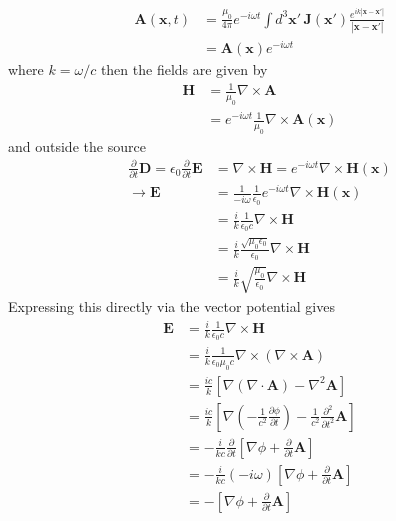 \documentclass[../main.tex]{subfiles}
\begin{document}
\begin{align}
\mathbf{A}(\mathbf{x},t)&=\frac{\mu_0}{4\pi}e^{-i\omega t}\int d^3\mathbf{x}'\,\mathbf{J}(\mathbf{x}')\frac{e^{ik|\mathbf{x}-\mathbf{x}'|}}{|\mathbf{x}-\mathbf{x}'|}\\
&=\mathbf{A}(\mathbf{x})e^{-i\omega t}
\end{align}
where $k=\omega/c$ then the fields are given by
\begin{align}
\mathbf{H}
&=\frac{1}{\mu_0}\nabla\times\mathbf{A}\\
&=e^{-i\omega t}\frac{1}{\mu_0}\nabla\times\mathbf{A}(\mathbf{x})
\end{align}
and outside the source
\begin{align}
\frac{\partial}{\partial t}\mathbf{D}
=\epsilon_0\frac{\partial}{\partial t}\mathbf{E}
&=\nabla\times\mathbf{H}=e^{-i\omega t}\nabla\times\mathbf{H}(\mathbf{x})\\
\rightarrow\mathbf{E}
&=\frac{1}{-i\omega}\frac{1}{\epsilon_0}e^{-i\omega t}\nabla\times\mathbf{H}(\mathbf{x})\\
&=\frac{i}{k}\frac{1}{\epsilon_0c}\nabla\times\mathbf{H}\\
&=\frac{i}{k}\frac{\sqrt{\mu_0\epsilon_0}}{\epsilon_0}\nabla\times\mathbf{H}\\
&=\frac{i}{k}\sqrt{\frac{\mu_0}{\epsilon_0}}\nabla\times\mathbf{H}
\end{align}
Expressing this directly via the vector potential gives
\begin{align}
\mathbf{E}
&=\frac{i}{k}\frac{1}{\epsilon_0c}\nabla\times\mathbf{H}\\
&=\frac{i}{k}\frac{1}{\epsilon_0\mu_0c}\nabla\times(\nabla\times\mathbf{A})\\
&=\frac{ic}{k}[\nabla(\nabla\cdot\mathbf{A})-\nabla^2\mathbf{A}]\\
&=\frac{ic}{k}[\nabla(-
\frac{1}{c^2}\frac{\partial\phi}{\partial t})-\frac{1}{c^2}\frac{\partial^2}{\partial t^2}\mathbf{A}]\\
&=-\frac{i}{kc}\frac{\partial}{\partial t}[\nabla\phi+\frac{\partial}{\partial t}\mathbf{A}]\\
&=-\frac{i}{kc}(-i\omega)[\nabla\phi+\frac{\partial}{\partial t}\mathbf{A}]\\
&=-[\nabla\phi+\frac{\partial}{\partial t}\mathbf{A}]
\end{align}
\end{document}
